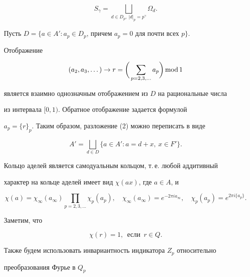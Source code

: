 \begin{equation} 


S_\gamma=\bigsqcup\limits_{d\in D_p,\ |d|_p=p^\gamma}\Omega_d. 


\end{equation} 


Пусть $D=\{a\in A':a_p\in D_p$, причем $a_p=0$ для почти всех $p\}$. 


Отображение 


$$ 


(a_2,a_3,\dotsc)\to r=\bigg(\sum_{p=2,3,\dotsc}a_p\bigg) 


\Mod 1 


$$ 


является взаимно однозначным отображением из $D$ на рациональные числа 


из интервала $[0,1)$. Обратное отображение задается формулой 


$a_p=\{r\}_p$. Таким образом, разложение (2) можно переписать в виде 


\begin{equation} 


A'=\bigsqcup\limits_{d\in D}\{a\in A':a=d+x,\ x\in F'\}. 


\end{equation} 


 


Кольцо аделей является самодуальным кольцом, т.\,е. любой аддитивный 


характер на кольце аделей имеет вид $\chi(a{}x)$, где $a\in A$, и 


$$ 


\chi(a)=\chi_\infty(a_\infty)\prod_{p=2,3,\dotsc}\chi_p(a_p), 


\quad \chi_\infty(a_\infty)=e^{-2\pi i a_\infty},\quad 


\chi_p(a_p)=e^{2\pi i\{a_p\}}. 


$$ 


Заметим, что 


\begin{equation} 


\chi(r)=1,\ \; \text{если}\ \; r\in Q. 


\end{equation} 


 


Также будем использовать инвариантность индикатора $Z_p$ относительно 


преобразования Фурье в $Q_p$ 


